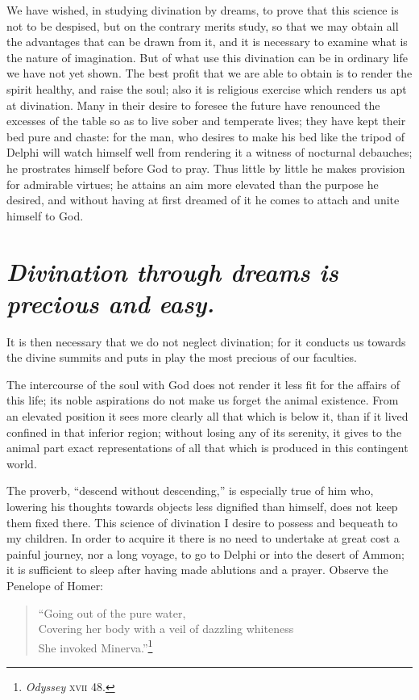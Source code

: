 \documentclass[12pt]{article}
\begin{document}
We have wished, in studying divination by dreams, to prove that this science is
not to be despised, but on the contrary merits study, so that we may obtain all
the advantages that can be drawn from it, and it is necessary to examine what
is the nature of imagination. But of what use this divination can be in
ordinary life we have not yet shown. The best profit that we are able to obtain
is to render the spirit healthy, and raise the soul; also it is religious
exercise which renders us apt at divination. Many in their desire to foresee
the future have renounced the excesses of the table so as to live sober and
temperate lives; they have kept their bed pure and chaste: for the man, who
desires to make his bed like the tripod of Delphi will watch himself well from
rendering it a witness of nocturnal debauches; he prostrates himself before God
to pray. Thus little by little he makes provision for admirable virtues; he
attains an aim more elevated than the purpose he desired, and without having
at first dreamed of it he comes to attach and unite himself to God.


\section{\mdseries\itshape Divination through dreams is precious and easy.}

It is then necessary that we do not neglect divination; for it conducts us
towards the divine summits and puts in play the most precious of our faculties.

The intercourse of the soul with God does not render it less fit for the
affairs of this life; its noble aspirations do not make us forget the animal
existence. From an elevated position it sees more clearly all that which is
below it, than if it lived confined in that inferior region; without losing any
of its serenity, it gives to the animal part exact representations of all that
which is produced in this contingent world.

The proverb, ``descend without descending,'' is especially true of him who,
lowering his thoughts towards objects less dignified than himself, does not
keep them fixed there. This science of divination I desire to possess and
bequeath to my children. In order to acquire it there is no need to undertake
at great cost a painful journey, nor a long voyage, to go to Delphi or into the
desert of Ammon; it is sufficient to sleep after having made ablutions and a
prayer. Observe the Penelope of Homer:

\begin{verse}
``Going out of the pure water,\\
Covering her body with a veil of dazzling whiteness\\
She invoked Minerva.''\footnote{\textit{Odyssey} \textsc{xvii} 48.}
\end{verse}
\end{document}
